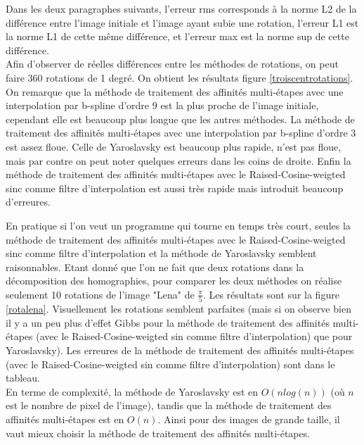 	Dans les deux paragraphes suivants, l'erreur rms corresponds à la norme L2 de la différence entre l'image initiale et l'image ayant subie une rotation, l'erreur L1 est la norme L1 de cette même différence, et l'erreur max est la norme sup de cette différence.\\

	Afin d'observer de réelles différences entre les méthodes de rotations, on peut faire 360 rotations de 1 degré. On obtient les résultats figure  \ref{troiscentrotations}.  On remarque que la méthode de traitement des affinités multi-étapes avec une interpolation par b-spline d'ordre 9 est la plus proche de l'image initiale, cependant elle est beaucoup plus longue que les autres méthodes.  La méthode de traitement des affinités multi-étapes avec une interpolation par b-spline d'ordre 3 est assez floue. Celle de Yaroslavsky est beaucoup plus rapide, n'est pas floue, mais par contre on peut noter quelques erreurs dans les coins de droite. Enfin  la méthode de traitement des affinités multi-étapes avec le  Raised-Cosine-weigted sinc comme filtre d'interpolation est aussi très rapide mais introduit beaucoup d'erreures.\\
\label{pleinsderotations}

	En pratique si l'on veut un programme qui tourne en temps très court, seules  la méthode de traitement des affinités multi-étapes avec le Raised-Cosine-weigted sinc comme filtre d'interpolation et la méthode de Yaroslavsky semblent raisonnables. Etant donné que l'on ne fait que deux rotations dans la décomposition des homographies, pour comparer les deux méthodes on réalise seulement 10 rotations de l'image "Lena" de $\frac{\pi}{5}$. Les résultats sont sur la figure \ref{rotalena}. Visuellement les rotations semblent parfaites (mais si on observe bien il y a un peu plus d'effet Gibbs pour la méthode de traitement des affinités multi-étapes (avec le Raised-Cosine-weigted sin comme filtre d'interpolation) que pour Yaroslavsky). Les erreures de la méthode de traitement des affinités multi-étapes (avec le Raised-Cosine-weigted sin comme filtre d'interpolation) sont dans le tableau. \\

En terme de complexité, la méthode de Yaroslavsky est en $O(n log(n))$ (où $n$ est le nombre de pixel de l'image), tandis que la méthode de traitement des affinités multi-étapes est en $O(n)$. Ainsi pour des images de grande taille, il vaut mieux choisir la méthode de traitement des affinités multi-étapes.\\

